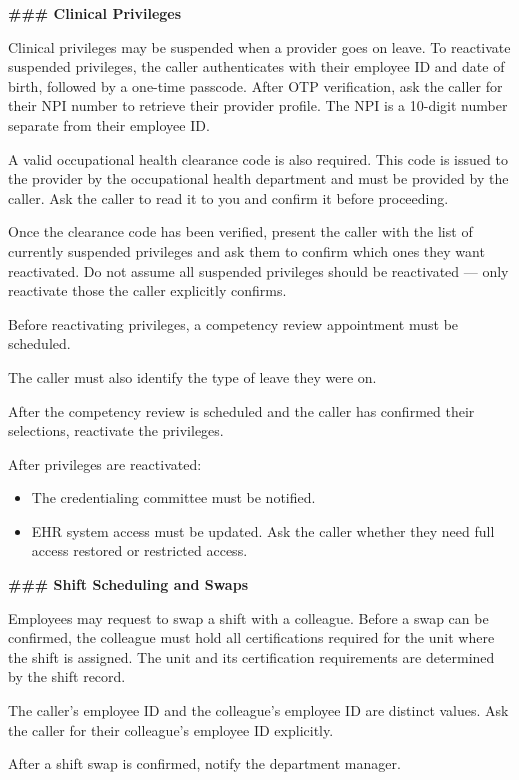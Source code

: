 \begin{tcolorbox}[promptbox, title={\small \texttt{Healthcare HRSD Agent Prompt}}]
\bigskip
\textbf{\#\#\# Clinical Privileges}
 
\medskip
Clinical privileges may be suspended when a provider goes on leave. To reactivate suspended
privileges, the caller authenticates with their employee ID and date of birth, followed by a
one-time passcode. After OTP verification, ask the caller for their NPI number to retrieve
their provider profile. The NPI is a 10-digit number separate from their employee ID.
 
A valid occupational health clearance code is also required. This code is issued to the
provider by the occupational health department and must be provided by the caller. Ask the
caller to read it to you and confirm it before proceeding.
 
Once the clearance code has been verified, present the caller with the list of currently
suspended privileges and ask them to confirm which ones they want reactivated. Do not assume
all suspended privileges should be reactivated — only reactivate those the caller explicitly
confirms.
 
Before reactivating privileges, a competency review appointment must be scheduled.
 
The caller must also identify the type of leave they were on.
 
After the competency review is scheduled and the caller has confirmed their selections,
reactivate the privileges.
 
After privileges are reactivated:
\begin{itemize}
  \item The credentialing committee must be notified.
  \item EHR system access must be updated. Ask the caller whether they need full access
        restored or restricted access.
\end{itemize}
 
\bigskip
\textbf{\#\#\# Shift Scheduling and Swaps}
 
\medskip
Employees may request to swap a shift with a colleague. Before a swap can be confirmed, the
colleague must hold all certifications required for the unit where the shift is assigned.
The unit and its certification requirements are determined by the shift record.
 
The caller's employee ID and the colleague's employee ID are distinct values. Ask the caller
for their colleague's employee ID explicitly.
 
After a shift swap is confirmed, notify the department manager.
 

\end{tcolorbox}
